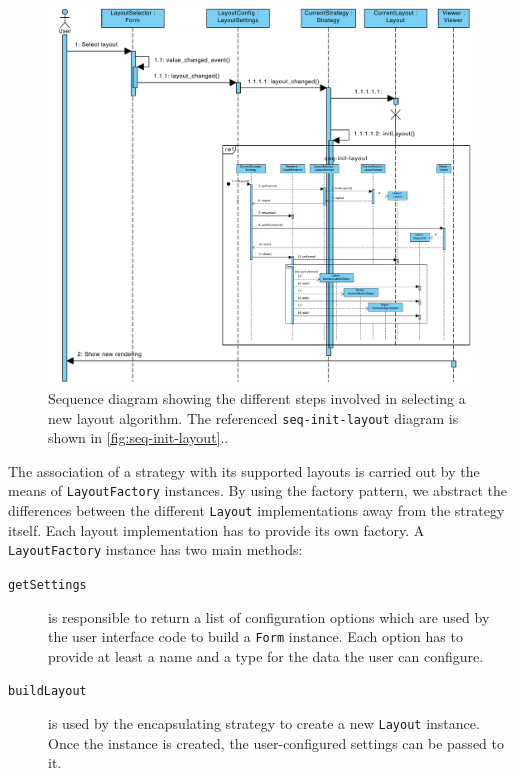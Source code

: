 \begin{figure}
  \begin{adjustwidth}{-4.7mm}{-6mm}  
    \includegraphics[width=\linewidth]{images/diagrams/seq-layout}
  \end{adjustwidth}
    \caption[Sequence diagram for the layout selection process.]{Sequence diagram showing the different steps involved in selecting a new layout algorithm. The referenced \texttt{seq-init-layout} diagram is shown in \vref{fig:seq-init-layout}..}
  \label{fig:seq-layout}
\end{figure}

The association of a strategy with its supported layouts is carried out by the means of \texttt{Layout\BreakableSlash{}Factory} instances. By using the factory pattern, we abstract the differences between the different \texttt{Layout} implementations away from the strategy itself. Each layout implementation has to provide its own factory. A \texttt{LayoutFactory} instance has two main methods:

\begin{description}
  \item[\texttt{getSettings}] is responsible to return a list of configuration options which are used by the user interface code to build a \texttt{Form} instance. Each option has to provide at least a name and a type for the data the user can configure.
  \item[\texttt{buildLayout}] is used by the encapsulating strategy to create a new \texttt{Layout} instance. Once the instance is created, the user-configured settings can be passed to it.
\end{description}

